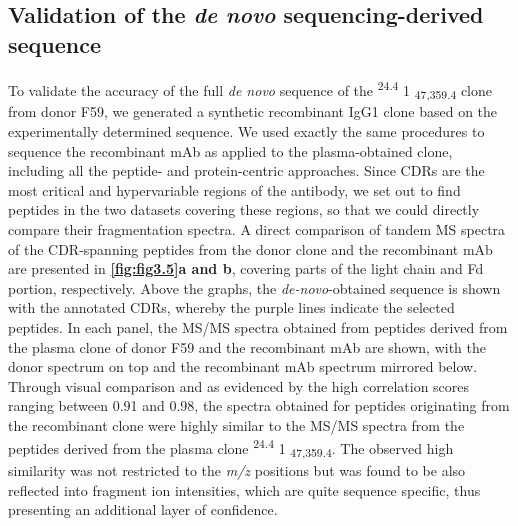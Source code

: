\subsection{Validation of the \emph{de novo} sequencing-derived sequence}
To validate the accuracy of the full \emph{de novo} sequence of the \textsuperscript{24.4} 1 \textsubscript{47,359.4} clone from donor F59, we generated a synthetic recombinant IgG1 clone based on the experimentally determined sequence. We used exactly the same procedures to sequence the recombinant mAb as applied to the plasma-obtained clone, including all the peptide- and protein-centric approaches. Since CDRs are the most critical and hypervariable regions of the antibody, we set out to find peptides in the two datasets covering these regions, so that we could directly compare their fragmentation spectra. A direct comparison of tandem MS spectra of the CDR-spanning peptides from the donor clone and the recombinant mAb are presented in \textbf{\autoref{fig:fig3.5}a and b}, covering parts of the light chain and Fd portion, respectively. Above the graphs, the \emph{de-novo}-obtained sequence is shown with the annotated CDRs, whereby the purple lines indicate the selected peptides. In each panel, the MS/MS spectra obtained from peptides derived from the plasma clone of donor F59 and the recombinant mAb are shown, with the donor spectrum on top and the recombinant mAb spectrum mirrored below. Through visual comparison and as evidenced by the high correlation scores ranging between 0.91 and 0.98, the spectra obtained for peptides originating from the recombinant clone were highly similar to the MS/MS spectra from the peptides derived from the plasma clone \textsuperscript{24.4} 1 \textsubscript{47,359.4}. The observed high similarity was not restricted to the \emph{m/z} positions but was found to be also reflected into fragment ion intensities, which are quite sequence specific, thus presenting an additional layer of confidence.
